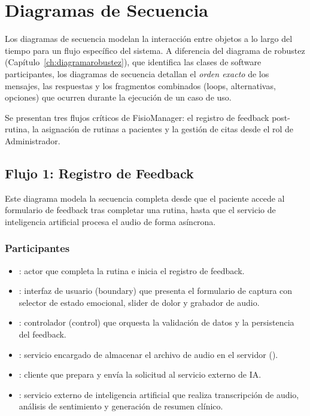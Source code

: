 
\chapter{Diagramas de Secuencia}\label{ch:diagramassecuencia}

Los diagramas de secuencia modelan la interacción entre objetos a lo largo del tiempo para un flujo específico del sistema. A diferencia del diagrama de robustez (Capítulo~\ref{ch:diagramarobustez}), que identifica las clases de software participantes, los diagramas de secuencia detallan el \emph{orden exacto} de los mensajes, las respuestas y los fragmentos combinados (loops, alternativas, opciones) que ocurren durante la ejecución de un caso de uso.

Se presentan tres flujos críticos de FisioManager: el registro de feedback post-rutina, la asignación de rutinas a pacientes y la gestión de citas desde el rol de Administrador.

\section{Flujo 1: Registro de Feedback}\label{sec:sec-feedback}

Este diagrama modela la secuencia completa desde que el paciente accede al formulario de feedback tras completar una rutina, hasta que el servicio de inteligencia artificial procesa el audio de forma asíncrona.

\subsection{Participantes}

\begin{itemize}
  \item {}: actor que completa la rutina e inicia el registro de feedback.
  \item {}: interfaz de usuario (boundary) que presenta el formulario de captura con selector de estado emocional, slider de dolor y grabador de audio.
  \item {}: controlador (control) que orquesta la validación de datos y la persistencia del feedback.
  \item {}: servicio encargado de almacenar el archivo de audio en el servidor ().
  \item {}: cliente que prepara y envía la solicitud al servicio externo de IA.
  \item {}: servicio externo de inteligencia artificial que realiza transcripción de audio, análisis de sentimiento y generación de resumen clínico.
\end{itemize}


